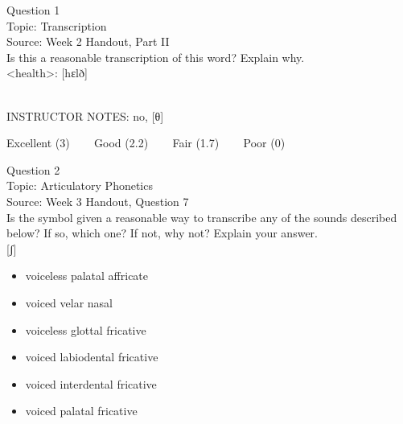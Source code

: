 \documentclass[12pt]{article}
\begin{document}
\begin{center}
\textbf{{\color{violet}{\HUGE 20201029 Thursday\\}}}

\textbf{{\color{violet}{\HUGE ALL EXAMS (with notes)\\}}}

\end{center}
\newpage

\begin{center}
\textbf{{\color{blue}{\HUGE START OF EXAM\\}}}

\textbf{{\color{blue}{\HUGE Student ID: 10699\\}}}

\textbf{{\color{blue}{\HUGE \\}}}

\end{center}
\newpage

{\large Question 1}\\

Topic: Transcription\\
Source: Week 2 Handout, Part II\\

Is this a reasonable transcription of this word? Explain why.\\

<health>: {[hɛlð]}


~\\
INSTRUCTOR NOTES: no, [θ]


\vfill
Excellent (3) ~~~ Good (2.2) ~~~ Fair (1.7) ~~~ Poor (0)
\newpage

{\large Question 2}\\

Topic: Articulatory Phonetics\\
Source: Week 3 Handout, Question 7\\

Is the symbol given a reasonable way to transcribe any of the sounds described below? If so, which one? If not, why not? Explain your answer.\\

{[ʃ]}

\begin{itemize} \item voiceless palatal affricate \item voiced velar nasal \item voiceless glottal fricative \item voiced labiodental fricative \item voiced interdental fricative \item voiced palatal fricative \end{itemize}
\end{document}
